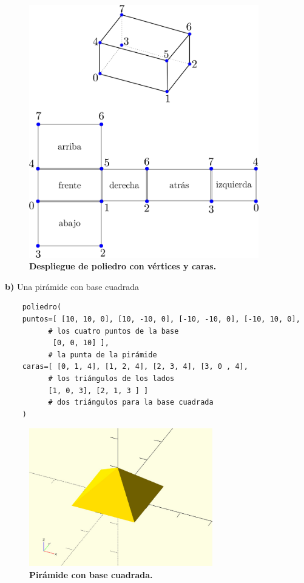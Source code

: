 \begin{figure}[h]
\includegraphics[width=10cm]{Img/Modelos/modelado8.png}
\centering
\caption{\textbf{ \footnotesize{Despliegue de poliedro con vértices y caras.}}}
\label{fig:poliedrodes}
\end{figure}

\clearpage
\textbf{b)} Una pirámide con base cuadrada

\begin{verbatim}
    poliedro(
    puntos=[ [10, 10, 0], [10, -10, 0], [-10, -10, 0], [-10, 10, 0], 
          # los cuatro puntos de la base
           [0, 0, 10] ],  
          # la punta de la pirámide                                
    caras=[ [0, 1, 4], [1, 2, 4], [2, 3, 4], [3, 0 , 4],               
          # los triángulos de los lados
          [1, 0, 3], [2, 1, 3 ] ]                         
          # dos triángulos para la base cuadrada
    )

\end{verbatim}

\begin{figure}[h]
\includegraphics[width=8cm]{Img/Modelos/modelado10.jpg}
\centering
\caption{\textbf{ \footnotesize{Pirámide con base cuadrada.}}}
\end{figure}

